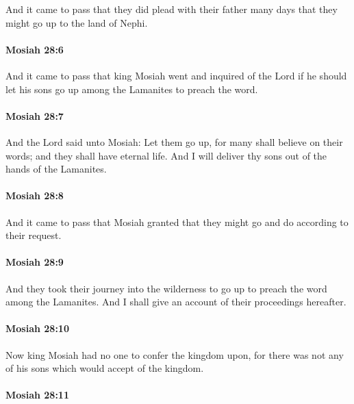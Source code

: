			And it came to pass that they did plead with their father many days
			that they might go up to the land of Nephi.

		\paragraph{Mosiah 28:6} %
			\label{MOSIAH-28-6}

			And it came to pass that king Mosiah went and inquired of the Lord
			if he should let his sons go up among the Lamanites to preach the word.

		\paragraph{Mosiah 28:7} %
			\label{MOSIAH-28-7}

			And the Lord said unto Mosiah:
			Let them go up, for many shall believe on their words;
			and they shall have eternal life.
			And I will deliver thy sons out of the hands of the Lamanites.

		\paragraph{Mosiah 28:8} %
			\label{MOSIAH-28-8}

			And it came to pass that Mosiah granted
			that they might go and do according to their request.

		\paragraph{Mosiah 28:9} %
			\label{MOSIAH-28-9}

			And they took their journey into the wilderness
			to go up to preach the word among the Lamanites.
			And I shall give an account of their proceedings hereafter.

		\paragraph{Mosiah 28:10} %
			\label{MOSIAH-28-10}

			Now king Mosiah had no one to confer the kingdom upon,
			for there was not any of his sons which would accept of the kingdom.

		\paragraph{Mosiah 28:11} %
			\label{MOSIAH-28-11}

